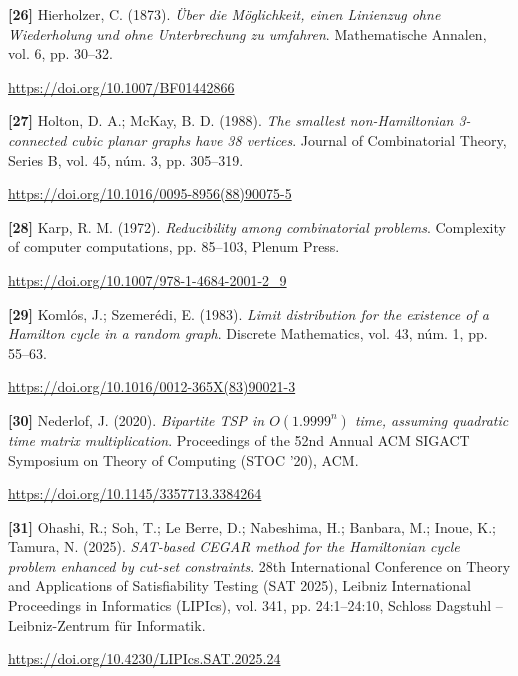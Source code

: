 \documentclass[11pt,a4paper]{article}
\newcommand{\referencia}[1]{\par\addvspace{0.8\baselineskip}\noindent\hangindent=1.1cm\hangafter=1 #1\par\nopagebreak}
\begin{document}
\begin{samepage}
\referencia{\textbf{[26]} Hierholzer, C. (1873). \textit{{\"U}ber die {M}{\"o}glichkeit, einen {L}inienzug ohne {W}iederholung und ohne {U}nterbrechung zu umfahren}. Mathematische Annalen, vol. 6, pp. 30--32.}
 {\small\url{https://doi.org/10.1007/BF01442866}}\par
\end{samepage}
\begin{samepage}
\referencia{\textbf{[27]} Holton, D. A.; McKay, B. D. (1988). \textit{The smallest non-{Hamiltonian} 3-connected cubic planar graphs have 38 vertices}. Journal of Combinatorial Theory, Series B, vol. 45, núm. 3, pp. 305--319.}
 {\small\url{https://doi.org/10.1016/0095-8956(88)90075-5}}\par
\end{samepage}
\begin{samepage}
\referencia{\textbf{[28]} Karp, R. M. (1972). \textit{Reducibility among combinatorial problems}. Complexity of computer computations, pp. 85--103, Plenum Press.}
 {\small\url{https://doi.org/10.1007/978-1-4684-2001-2_9}}\par
\end{samepage}
\begin{samepage}
\referencia{\textbf{[29]} Koml{\'o}s, J.; Szemer{\'e}di, E. (1983). \textit{Limit distribution for the existence of a {Hamilton} cycle in a random graph}. Discrete Mathematics, vol. 43, núm. 1, pp. 55--63.}
 {\small\url{https://doi.org/10.1016/0012-365X(83)90021-3}}\par
\end{samepage}
\begin{samepage}
\referencia{\textbf{[30]} Nederlof, J. (2020). \textit{Bipartite {TSP} in $O(1.9999^n)$ time, assuming quadratic time matrix multiplication}. Proceedings of the 52nd Annual {ACM} {SIGACT} Symposium on Theory of Computing ({STOC} '20), ACM.}
 {\small\url{https://doi.org/10.1145/3357713.3384264}}\par
\end{samepage}
\begin{samepage}
\referencia{\textbf{[31]} Ohashi, R.; Soh, T.; {Le Berre}, D.; Nabeshima, H.; Banbara, M.; Inoue, K.; Tamura, N. (2025). \textit{{SAT}-based {CEGAR} method for the {Hamiltonian} cycle problem enhanced by cut-set constraints}. 28th International Conference on Theory and Applications of Satisfiability Testing ({SAT} 2025), Leibniz International Proceedings in Informatics (LIPIcs), vol. 341, pp. 24:1--24:10, Schloss Dagstuhl -- Leibniz-Zentrum f{\"u}r Informatik.}
 {\small\url{https://doi.org/10.4230/LIPIcs.SAT.2025.24}}\par
\end{samepage}
\end{document}
